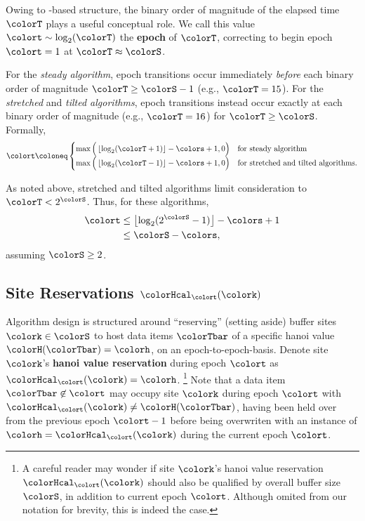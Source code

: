 Owing to \hv{}-based structure, the binary order of magnitude of the elapsed time $\colorT$ plays a useful conceptual role.
We call this value $\colort \sim \log_2(\colorT)$ the \textbf{epoch} of $\colorT$, correcting to begin epoch $\colort=1$ at $\colorT \approx \colorS$.

For the \textit{steady algorithm}, epoch transitions occur immediately \textit{before} each binary order of magnitude $\colorT \geq \colorS - 1$ (e.g.,  $\colorT = 15$).
For the \textit{stretched} and \textit{tilted algorithms}, epoch transitions instead occur exactly at each binary order of magnitude (e.g., $\colorT = 16$) for $\colorT \geq \colorS$.
Formally,
\begin{equation}
\colort
\coloneq
\begin{cases}
\max\Big(\left\lfloor \log_2(\colorT+1) \right\rfloor - \colors + 1, 0\Big) & \text{for steady algorithm} \\
\max\Big(\left\lfloor \log_2(\colorT - 1) \right\rfloor - \colors + 1, 0\Big) & \text{for stretched and tilted algorithms.}
\end{cases}
\label{eqn:epoch-defn}
\end{equation}

As noted above, stretched and tilted algorithms limit consideration to $\colorT < 2^{\colorS}$.
Thus, for these algorithms,
\begin{align*}
\colort &\leq \left\lfloor\log_2(2^{\colorS} - 1)\right\rfloor - \colors + 1 \\
&\leq \colorS - \colors,
\end{align*}
assuming $\colorS \geq 2$.

\subsection{Site Reservations $\colorHcal_{\colort}(\colork)$}
\label{sec:notation-reservation}

Algorithm design is structured around ``reserving'' (setting aside) buffer sites $\colork \in \colorS$ to host data items $\colorTbar$ of a specific hanoi value $\colorH(\colorTbar) = \colorh$, on an epoch-to-epoch-basis.
Denote site $\colork$'s \textbf{hanoi value reservation} during epoch $\colort$ as $\colorHcal_{\colort}(\colork) = \colorh$.%
\footnote{%
A careful reader may wonder if site $\colork$'s hanoi value reservation $\colorHcal_{\colort}(\colork)$ should also be qualified by overall buffer size $\colorS$, in addition to current epoch $\colort$.
Although omited from our notation for brevity, this is indeed the case.%
}%
Note that a data item $\colorTbar \not\in \colort$ may occupy site $\colork$ during epoch $\colort$ with $\colorHcal_{\colort}(\colork) \neq \colorH(\colorTbar)$, having been held over from the previous epoch $\colort - 1$ before being overwriten with an instance of \hv{} $\colorh = \colorHcal_{\colort}(\colork)$ during the current epoch $\colort$.

